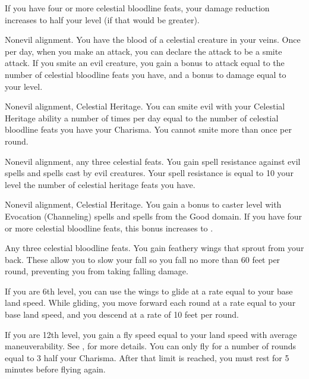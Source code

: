 If you have four or more celestial bloodline feats, your damage reduction increases to half your level (if that would be greater).

 Nonevil alignment.
 You have the blood of a celestial creature in your veins. Once per day, when you make an attack, you can declare the attack to be a smite attack. If you smite an evil creature, you gain a bonus to attack equal to the number of celestial bloodline feats you have, and a bonus to damage equal to your level.

 Nonevil alignment, Celestial Heritage.
 You can smite evil with your Celestial Heritage ability a number of times per day equal to the number of celestial bloodline feats you have \add your Charisma. You cannot smite more than once per round.

 Nonevil alignment, any three celestial feats.
 You gain spell resistance against evil spells and spells cast by evil creatures. Your spell resistance is equal to 10 \add your level \add the number of celestial heritage feats you have.

 Nonevil alignment, Celestial Heritage.
 You gain a  bonus to caster level with Evocation (Channeling) spells and spells from the Good domain. If you have four or more celestial bloodline feats, this bonus increases to .

 Any three celestial bloodline feats.
 You gain feathery wings that sprout from your back. These allow you to slow your fall so you fall no more than 60 feet per round, preventing you from taking falling damage.

If you are 6th level, you can use the wings to glide at a rate equal to your base land speed. While gliding, you move forward each round at a rate equal to your base land speed, and you descend at a rate of 10 feet per round.

If you are 12th level, you gain a fly speed equal to your land speed with average maneuverability. See , for more details. You can only fly for a number of rounds equal to 3 \add half your Charisma. After that limit is reached, you must rest for 5 minutes before flying again.

